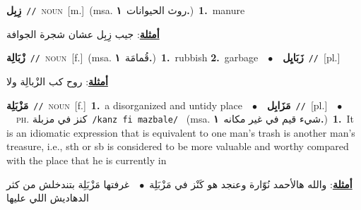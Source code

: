 \documentclass[10pt,a4paper,twoside]{article} %
\begin{document}
\begin{multicols}{2}
{\setlength\topsep{0pt}\textbf{\foreignlanguage{arabic}{زِبِل}}\ {\color{gray}\texttt{//}\color{black}}\ \textsc{noun}\ [m.]\ \color{gray}(msa. \foreignlanguage{arabic}{روث الحيوانات}~\foreignlanguage{arabic}{\textbf{١.}})\color{black}\ \textbf{1.}~manure\  \begin{flushright}\color{gray}\foreignlanguage{arabic}{\textbf{\underline{\foreignlanguage{arabic}{أمثلة}}}: جيب زِبِل عشان شجرة الجوافة}\end{flushright}\color{black}} \vspace{2mm}

{\setlength\topsep{0pt}\textbf{\foreignlanguage{arabic}{زْبَالِة}}\ {\color{gray}\texttt{//}\color{black}}\ \textsc{noun}\ [f.]\ \color{gray}(msa. \foreignlanguage{arabic}{قُمامَة}~\foreignlanguage{arabic}{\textbf{١.}})\color{black}\ \textbf{1.}~rubbish  \textbf{2.}~garbage\ \ $\bullet$\ \ \setlength\topsep{0pt}\textbf{\foreignlanguage{arabic}{زَبَايِل}}\ {\color{gray}\texttt{//}\color{black}}\ [pl.]\  \begin{flushright}\color{gray}\foreignlanguage{arabic}{\textbf{\underline{\foreignlanguage{arabic}{أمثلة}}}: روح كب الزْبالِة ولا}\end{flushright}\color{black}} \vspace{2mm}

{\setlength\topsep{0pt}\textbf{\foreignlanguage{arabic}{مَزْبَلِة}}\ {\color{gray}\texttt{//}\color{black}}\ \textsc{noun}\ [f.]\ \textbf{1.}~a disorganized and untidy place\ \ $\bullet$\ \ \setlength\topsep{0pt}\textbf{\foreignlanguage{arabic}{مَزَابِل}}\ {\color{gray}\texttt{//}\color{black}}\ [pl.]\ \ $\bullet$\ \ \textsc{ph.} \color{gray} \foreignlanguage{arabic}{كنز في مزبلة}\color{black}\ {\color{gray}\texttt{/{\sffamily kanz fi mazbale}/}\color{black}}\ \color{gray} (msa. \foreignlanguage{arabic}{شيء قيم في غير مكانه}~\foreignlanguage{arabic}{\textbf{١.}})\color{black}\ \textbf{1.}~It is an idiomatic expression that is equivalent to one man's trash is another man's treasure, i.e., sth or sb is considered to be more valuable and worthy compared with the place that he is currently in\  \begin{flushright}\color{gray}\foreignlanguage{arabic}{\textbf{\underline{\foreignlanguage{arabic}{أمثلة}}}: والله هالأحمد نُوّارة وعنجد هو كَنْز في مَزْبَلِة\ $\bullet$\ \  غرفتها مَزْبَلِة بتندخلش من كثر الدهاديش اللي عليها}\end{flushright}\color{black}} \vspace{2mm}


\end{multicols}
\end{document}
